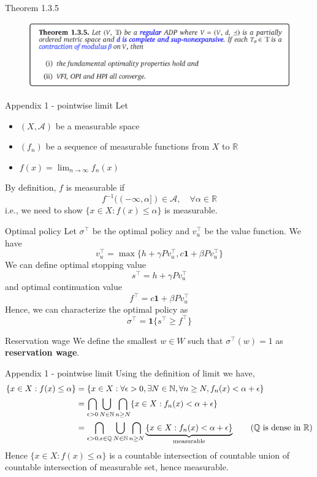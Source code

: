 \documentclass[aspectratio=169]{beamer} %
\begin{document}
\begin{frame}{Theorem 1.3.5}
    \begin{figure}
        \centering
        \includegraphics[width=1\linewidth]{Dynamic Programming/DP2/Chapter 4/4.2.4.1 Job Search with Separation/thm135.png}
    \end{figure}
\end{frame}
\begin{frame}{Appendix 1 - pointwise limit}
    Let 
    \begin{itemize}
        \item $(X,\mathcal{A})$ be a measurable space
        \item $(f_n)$ be a sequence of measurable functions from $X$ to $\mathbb{R}$
        \item $f(x) = \lim_{n\to\infty} f_n(x)$
    \end{itemize}
    By definition, $f$ is measurable if
    $$
    f^{-1}((-\infty, \alpha])\in\mathcal{A},\quad \forall \alpha\in\mathbb{R}
    $$
    i.e., we need to show $\{x\in X: f(x)\le \alpha\}$ is measurable. 
\end{frame}
\begin{frame}{Optimal policy}
Let $\sigma^\top$ be the optimal policy and $v_u^\top$ be the value function. We have
$$
v_u^\top = \max\{h+\gamma Pv_u^\top, c\mathbf{1} + \beta Pv_u^\top\}
$$
We can define optimal stopping value
$$
s^\top = h+\gamma Pv_u^\top
$$
and 
optimal continuation value
$$
f^\top = c\mathbf{1}+\beta Pv_u^\top
$$
Hence, we can characterize the optimal policy as
$$
\sigma^\top = \mathbf{1}{\{s^\top\ge f^\top\}}
$$
\end{frame}
\begin{frame}{Reservation wage}
We define the smallest $w\in W$ such that $\sigma^\top (w) =1$ as \textbf{reservation wage}.
    
\end{frame}
\begin{frame}{Appendix 1 - pointwise limit}
Using the definition of limit we have,
\begin{align*}
    \{x\in X: f(x)\le \alpha\} &= \{x\in X: \forall\epsilon>0,\exists N\in\mathbb{N}, \forall n\ge N, f_n(x)<\alpha+\epsilon\}\\
    &= \bigcap_{\epsilon>0}\bigcup_{N\in\mathbb{N}}\bigcap_{n\ge N} \{x\in X: f_n(x)<\alpha+\epsilon\}\\
    &= \bigcap_{\epsilon>0,\epsilon\in \mathbb{Q}}\bigcup_{N\in\mathbb{N}}\bigcap_{n\ge N}\underbrace{\{x\in X: f_n(x)<\alpha+\epsilon\}}_{\text{measurable}}\tag{$\mathbb{Q}$ is dense in $\mathbb{R}$}\\
\end{align*}
Hence $\{x\in X: f(x)\le \alpha\}$ is a countable intersection of countable union of countable intersection of measurable set, hence measurable.
    
\end{frame}
\end{document}
